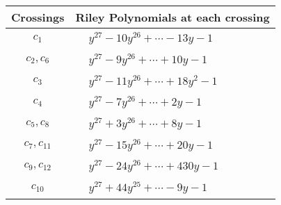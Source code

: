 \documentclass[1p]{elsarticle_modified}
\theoremstyle{definition}
\begin{document}
\begin{tabular}{m{50pt}|m{274pt}}
Crossings & \hspace{64pt}Riley Polynomials at each crossing \\
\hline $$\begin{aligned}c_{1}\end{aligned}$$&$\begin{aligned}
&y^{27}-10 y^{26}+\cdots-13 y-1
\end{aligned}$\\
\hline $$\begin{aligned}c_{2},c_{6}\end{aligned}$$&$\begin{aligned}
&y^{27}-9 y^{26}+\cdots+10 y-1
\end{aligned}$\\
\hline $$\begin{aligned}c_{3}\end{aligned}$$&$\begin{aligned}
&y^{27}-11 y^{26}+\cdots+18 y^2-1
\end{aligned}$\\
\hline $$\begin{aligned}c_{4}\end{aligned}$$&$\begin{aligned}
&y^{27}-7 y^{26}+\cdots+2 y-1
\end{aligned}$\\
\hline $$\begin{aligned}c_{5},c_{8}\end{aligned}$$&$\begin{aligned}
&y^{27}+3 y^{26}+\cdots+8 y-1
\end{aligned}$\\
\hline $$\begin{aligned}c_{7},c_{11}\end{aligned}$$&$\begin{aligned}
&y^{27}-15 y^{26}+\cdots+20 y-1
\end{aligned}$\\
\hline $$\begin{aligned}c_{9},c_{12}\end{aligned}$$&$\begin{aligned}
&y^{27}-24 y^{26}+\cdots+430 y-1
\end{aligned}$\\
\hline $$\begin{aligned}c_{10}\end{aligned}$$&$\begin{aligned}
&y^{27}+44 y^{25}+\cdots-9 y-1
\end{aligned}$\\
\hline
\end{tabular}\\~\\
\end{document}
